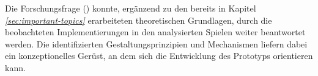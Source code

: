 Die Forschungsfrage () konnte, ergänzend zu den bereits in Kapitel \textit{\ref{sec:important-topics}} erarbeiteten theoretischen Grundlagen, durch die beobachteten Implementierungen in den analysierten Spielen weiter beantwortet werden. Die identifizierten Gestaltungsprinzipien und Mechanismen liefern dabei ein  konzeptionelles Gerüst, an dem sich die Entwicklung des Prototyps orientieren kann.